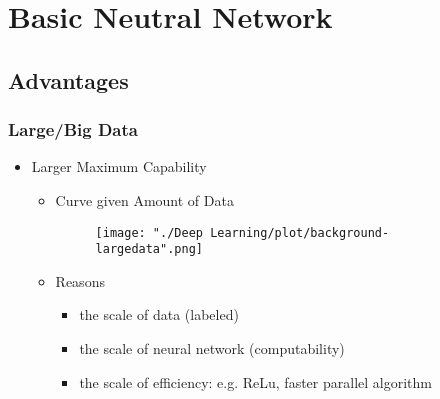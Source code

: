 \section{Basic Neutral Network}

\subsection{Advantages}
\subsubsection{Large/Big Data}
\begin{itemize}
\item Larger Maximum Capability
	\begin{itemize}
	\item Curve given Amount of Data
	\begin{figure}[ht]
	\texttt{[image: "./Deep Learning/plot/background-largedata".png]}
	\end{figure}
	\item Reasons
		\begin{itemize}
		\item the scale of data (labeled)
		\item the scale of neural network (computability)
		\item the scale of efficiency: e.g. ReLu, faster parallel algorithm
		\end{itemize}
	\end{itemize}
\end{itemize}

